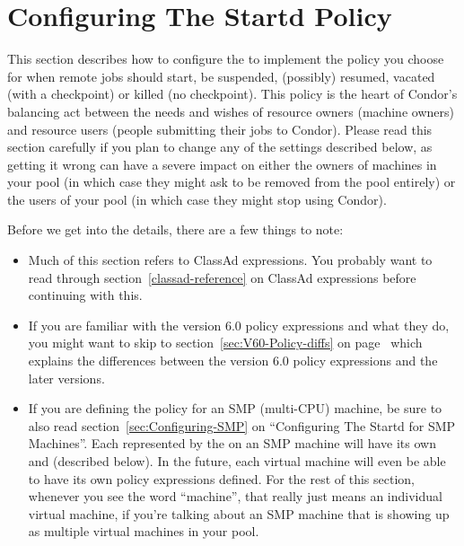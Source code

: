 \section{\label{sec:Configuring-Policy}
Configuring The Startd Policy}

This section describes how to configure the  to
implement the policy you choose for when remote jobs should start, be
suspended, (possibly) resumed, vacated (with a checkpoint) or killed
(no checkpoint).  This policy is the heart of Condor's balancing act
between the needs and wishes of resource owners (machine owners) and
resource users (people submitting their jobs to Condor).  Please read
this section carefully if you plan to change any of the settings
described below, as getting it wrong can have a severe impact on
either the owners of machines in your pool (in which case they might
ask to be removed from the pool entirely) or the users of your pool
(in which case they might stop using Condor).

Before we get into the details, there are a few things to note:
\begin{itemize}
\item Much of this section refers to ClassAd expressions.  You
probably want to read through section~\ref{classad-reference} on
ClassAd expressions before continuing with this.

\item If you are familiar with the version 6.0 policy expressions and
what they do, you might want to skip to
section~\ref{sec:V60-Policy-diffs} on
page~\pageref{sec:V60-Policy-diffs} which explains the differences
between the version 6.0 policy expressions and the later versions.  

\item If you are defining the policy for an SMP (multi-CPU) machine,
be sure to also read section~\ref{sec:Configuring-SMP} on
``Configuring The Startd for SMP Machines''.  
Each  represented by the  on an
SMP machine will have its own  and 
(described below). 
In the future, each virtual machine will even be able to have its
own policy expressions defined.
For the rest of this section, whenever you see the word ``machine'',
that really just means an individual virtual machine, if you're
talking about an SMP machine that is showing up as multiple virtual
machines in your pool.  
\end{itemize}

